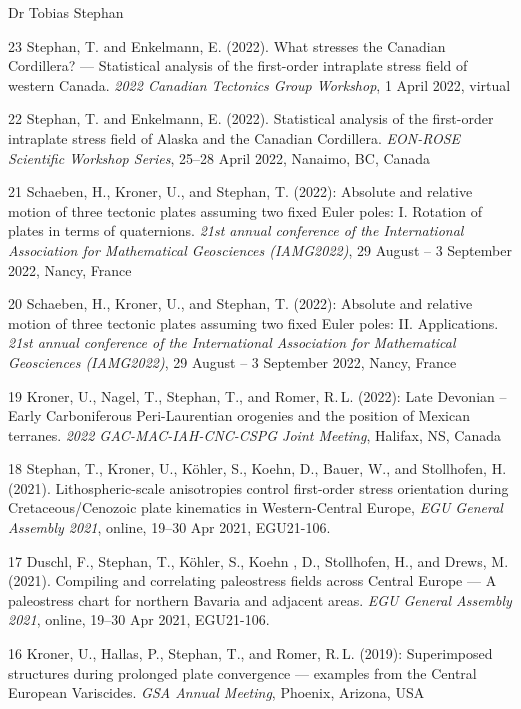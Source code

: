 \documentclass[10pt, paper=letter]{scrartcl} %
\begin{document}
\begin{cv}{\textsf{Dr Tobias Stephan}}
\begin{cvlist}{}
        \item[23] Stephan, T. and Enkelmann, E. (2022). What stresses the Canadian Cordillera? --- Statistical analysis of the first-order intraplate stress field of western Canada. \textit{2022 Canadian Tectonics Group Workshop}, 1 April 2022, virtual
        \item[22] Stephan, T. and Enkelmann, E. (2022). Statistical analysis of the first-order intraplate stress field of Alaska and the Canadian Cordillera. \textit{EON-ROSE Scientific Workshop Series}, 25--28 April 2022, Nanaimo, BC, Canada
        \item[21] Schaeben, H., Kroner, U., and Stephan, T. (2022): Absolute and relative motion of three tectonic plates assuming two fixed Euler poles: I. Rotation of plates in terms of quaternions. \textit{21st annual conference of the International Association for Mathematical Geosciences (IAMG2022)}, 29 August -- 3 September 2022, Nancy, France
        \item[20] Schaeben, H., Kroner, U., and Stephan, T. (2022): Absolute and relative motion of three tectonic plates assuming two fixed Euler poles: II. Applications. \textit{21st annual conference of the International Association for Mathematical Geosciences (IAMG2022)}, 29 August -- 3 September 2022, Nancy, France
        \item[19] Kroner, U., Nagel, T., Stephan, T., and Romer, R.\,L. (2022): Late Devonian – Early Carboniferous Peri-Laurentian orogenies and the position of Mexican terranes. \textit{2022 GAC-MAC-IAH-CNC-CSPG Joint Meeting}, Halifax, NS, Canada
        \item[18] Stephan, T., Kroner, U., K\"ohler, S., Koehn, D., Bauer, W., and Stollhofen, H. (2021). Lithospheric-scale anisotropies control first-order stress orientation during Cretaceous\-/Cenozoic plate kinematics in Western-Central Europe, \textit{EGU General Assembly 2021}, online, 19--30 Apr 2021, EGU21-106. 
        \item[17] Duschl, F., Stephan, T., K\"ohler, S., Koehn , D., Stollhofen, H., and Drews, M. (2021). Compiling and correlating paleostress fields across Central Europe --- A paleostress chart for northern Bavaria and adjacent areas. \textit{EGU General Assembly 2021}, online, 19--30 Apr 2021, EGU21-106. 
        \item[16] Kroner, U., Hallas, P., Stephan, T., and Romer, R.\,L. (2019): Superimposed structures during prolonged plate convergence --- examples from the Central European Variscides. \textit{GSA Annual Meeting}, Phoenix, Arizona, USA

\end{cvlist}
\end{cv}
\end{document}

